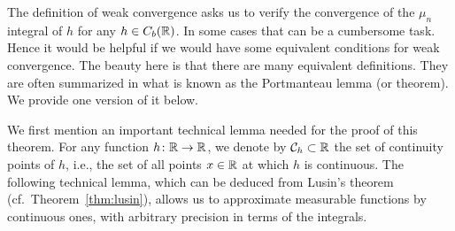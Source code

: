 The definition of weak convergence asks us to verify the convergence of the $\mu_n$ integral of $h$ for any $h\in C_b(\mathbb R)$. In some cases that can be a cumbersome task. Hence it would be helpful if we would have some equivalent conditions for weak convergence. The beauty here is that there are many equivalent definitions. They are often summarized in what is known as the Portmanteau lemma (or theorem). We provide one version of it below.


\medskip

We first mention an important technical lemma needed for the proof of this theorem. For any function $h\colon \mathbb R \to \mathbb R$, we denote by $\mathcal C_h \subset \mathbb R$ the set of continuity points of $h$, i.e., the set of all points $x\in \mathbb R$ at which $h$ is continuous. The following technical lemma, which can be deduced from Lusin's theorem (cf.~Theorem~\ref{thm:lusin}), allows us to approximate measurable functions by continuous ones, with arbitrary precision in terms of the integrals. 

